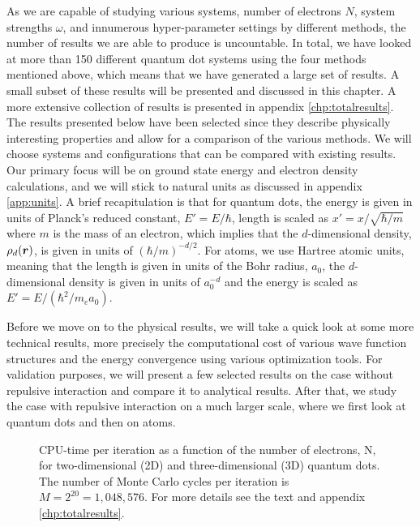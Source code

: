 As we are capable of studying various systems, number of electrons $N$, system strengths $\omega$, and innumerous hyper-parameter settings by different methods, the number of results we are able to produce is uncountable. In total, we have looked at more than 150 different quantum dot systems using the four methods mentioned above, which means that we have generated a large set of results. A small subset of these results will be presented and discussed in this chapter. A more extensive collection of results is presented in appendix \ref{chp:totalresults}. The results presented below have been selected since they describe physically interesting properties and allow for a comparison of the various methods. We will choose systems and configurations that can be compared with existing results. Our primary focus will be on ground state energy and electron density calculations, and we will stick to natural units as discussed in appendix \ref{app:units}. A brief recapitulation is that for quantum dots, the energy is given in units of Planck's reduced constant, $E'=E/\hbar$, length is scaled as $x'=x/\sqrt{\hbar/m}$ where $m$ is the mass of an electron, which implies that the $d$-dimensional density, $\rho_d(\boldsymbol{{r}})$, is given in units of $(\hbar/m)^{-d/2}$. For atoms, we use Hartree atomic units, meaning that the length is given in units of the Bohr radius, $a_0$, the $d$-dimensional density is given in units of $a_0^{-d}$ and the energy is scaled as $E'=E/(\hbar^2/m_ea_0)$.

Before we move on to the physical results, we will take a quick look at some more technical results, more precisely the computational cost of various wave function structures and the energy convergence using various optimization tools. For validation purposes, we will present a few selected results on the case without repulsive interaction and compare it to analytical results. After that, we study the case with repulsive interaction on a much larger scale, where we first look at quantum dots and then on atoms.

\begin{figure}
	\centering 
	
	\caption{CPU-time per iteration as a function of the number of electrons, N, for two-dimensional (2D) and three-dimensional (3D) quantum dots. The number of Monte Carlo cycles per iteration is $M=2^{20}=1,048,576$. For more details see the text and appendix \ref{chp:totalresults}.}
	\label{fig:cpu_time}
\end{figure} 

